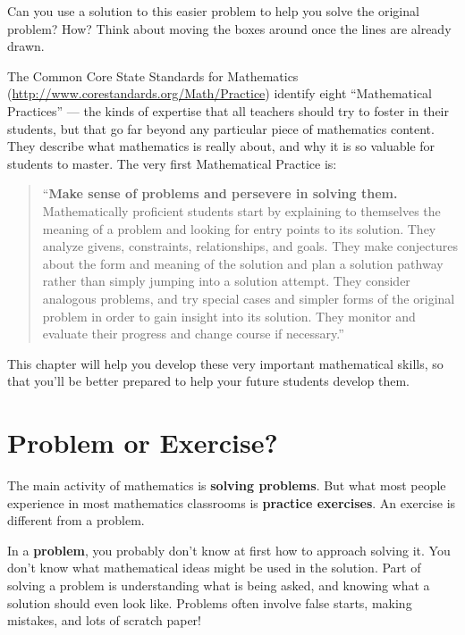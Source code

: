 Can you use a solution to this easier problem to help you solve the original problem?  How?  Think about moving the boxes around once the lines are already drawn.


The Common Core State Standards for Mathematics (\url{http://www.corestandards.org/Math/Practice}) identify eight ``Mathematical Practices'' --- the kinds of expertise that all teachers should try to foster in their students, but that go far beyond any particular piece of mathematics content.  They describe what mathematics is really about, and why it is so valuable for students to master.  The very first Mathematical Practice is:

\begin{quote}
``{\bf Make sense of problems and persevere in solving them.}\\
Mathematically proficient students start by explaining to themselves the meaning of a problem and looking for entry points to its solution. They analyze givens, constraints, relationships, and goals. They make conjectures about the form and meaning of the solution and plan a solution pathway rather than simply jumping into a solution attempt. They consider analogous problems, and try special cases and simpler forms of the original problem in order to gain insight into its solution. They monitor and evaluate their progress and change course if necessary.''
\end{quote}

This chapter will help you develop these very important mathematical skills, so that you'll be better prepared to help your future students develop them.


\section{Problem or Exercise?}
The main activity of mathematics is {\bf solving problems}.  But what most people experience in most mathematics classrooms is {\bf practice exercises}.  An exercise is different from a problem.


In a {\bf problem}, you probably don't know at first how to approach solving it.  You 
don't know what mathematical ideas might be used in the solution.  Part of solving a problem is understanding what is being asked, and knowing what a solution should even look like.  Problems often involve false starts, making mistakes, and lots of scratch paper!

